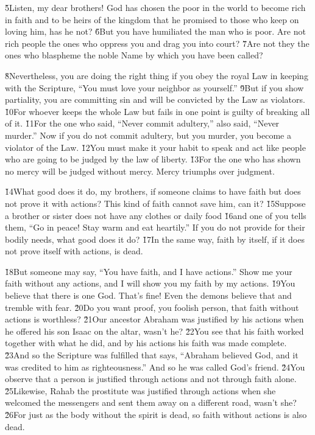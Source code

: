 \v{5}Listen, my dear brothers! God has chosen the poor in the world to become rich in faith and to be heirs of the kingdom that he promised to those who keep on loving him, has he not? \v{6}But you have humiliated the man who is poor. Are not rich people the ones who oppress you and drag you into court? \v{7}Are not they the ones who blaspheme the noble Name by which you have been called?

\v{8}Nevertheless, you are doing the right thing if you obey the royal Law in keeping with the Scripture, ``You must love your neighbor as yourself.'' \v{9}But if you show partiality, you are committing sin and will be convicted by the Law as violators. \v{10}For whoever keeps the whole Law but fails in one point is guilty of breaking all of it. \v{11}For the one who said, ``Never commit adultery,'' also said, ``Never murder.'' Now if you do not commit adultery, but you murder, you become a violator of the Law. \v{12}You must make it your habit to speak and act like people who are going to be judged by the law of liberty. \v{13}For the one who has shown no mercy will be judged without mercy. Mercy triumphs over judgment.

\v{14}What good does it do, my brothers, if someone claims to have faith but does not prove it with actions? This kind of faith cannot save him, can it? \v{15}Suppose a brother or sister does not have any clothes or daily food \v{16}and one of you tells them, ``Go in peace! Stay warm and eat heartily.'' If you do not provide for their bodily needs, what good does it do? \v{17}In the same way, faith by itself, if it does not prove itself with actions, is dead.

\v{18}But someone may say, ``You have faith, and I have actions.'' Show me your faith without any actions, and I will show you my faith by my actions. \v{19}You believe that there is one God. That's fine! Even the demons believe that and tremble with fear. \v{20}Do you want proof, you foolish person, that faith without actions is worthless? \v{21}Our ancestor Abraham was justified by his actions when he offered his son Isaac on the altar, wasn't he? \v{22}You see that his faith worked together with what he did, and by his actions his faith was made complete. \v{23}And so the Scripture was fulfilled that says, ``Abraham believed God, and it was credited to him as righteousness.'' And so he was called God's friend. \v{24}You observe that a person is justified through actions and not through faith alone. \v{25}Likewise, Rahab the prostitute was justified through actions when she welcomed the messengers and sent them away on a different road, wasn't she? \v{26}For just as the body without the spirit is dead, so faith without actions is also dead.

